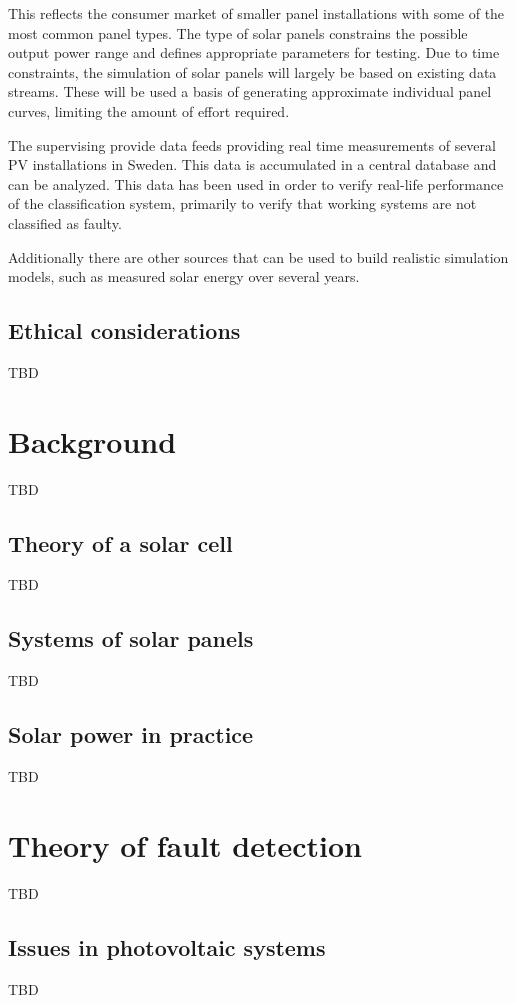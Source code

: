 \documentclass[a4paper,11pt]{report}
\begin{document}
This reflects the consumer market of smaller panel installations with some of the most common panel types.
The type of solar panels constrains the possible output power range and defines appropriate parameters for testing.
Due to time constraints, the simulation of solar panels will largely be based on existing data streams.
These will be used a basis of generating approximate individual panel curves, limiting the amount of effort required.

The supervising provide data feeds providing real time measurements of several PV installations in Sweden.
This data is accumulated in a central database and can be analyzed.
This data has been used in order to verify real-life performance of the classification system, primarily to verify that working systems are not classified as faulty.

Additionally there are other sources that can be used to build realistic simulation models, such as measured solar energy over several years.

\section{Ethical considerations}
TBD


\chapter{Background}
TBD

\section{Theory of a solar cell}
TBD

\section{Systems of solar panels}
TBD

\section{Solar power in practice}
TBD


\chapter{Theory of fault detection}
TBD

\section{Issues in photovoltaic systems}
TBD
\end{document}
